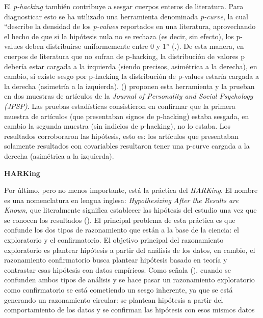 \documentclass[
  spanish,
  a4paper,
  oneside]{scrbook}
\begin{document}
El \emph{p-hacking} también contribuye a sesgar cuerpos enteros de
literatura. Para diagnosticar esto se ha utilizado una herramienta
denominada \emph{p-curve}, la cual ``describe la densidad de los
\emph{p-values} reportados en una literatura, aprovechando el hecho de
que si la hipótesis nula no se rechaza (es decir, sin efecto), los
p-values deben distribuirse uniformemente entre 0 y 1''
(.). De esta manera, en cuerpos de literatura que no
sufran de p-hacking, la distribución de valores p debería estar cargada
a la izquierda (siendo precisos, asimétrica a la derecha), en cambio, si
existe sesgo por p-hacking la distribución de p-values estaría cargada a
la derecha (asimetría a la izquierda).
() proponen esta herramienta y la prueban en dos muestras de
artículos de la \emph{Journal of Personality and Social Psychology
(JPSP)}. Las pruebas estadísticas consistieron en confirmar que la
primera muestra de artículos (que presentaban signos de p-hacking)
estaba sesgada, en cambio la segunda muestra (sin indicios de
p-hacking), no lo estaba. Los resultados corroboraron las hipótesis,
esto es: los artículos que presentaban solamente resultados con
covariables resultaron tener una p-curve cargada a la derecha
(asimétrica a la izquierda).

\textbf{HARKing}

Por último, pero no menos importante, está la práctica del
\emph{HARKing}. El nombre es una nomenclatura en lengua inglesa:
\emph{Hypothesizing After the Results are Known}, que literalmente
significa establecer las hipótesis del estudio una vez que se conocen
los resultados (). El
principal problema de esta práctica es que confunde los dos tipos de
razonamiento que están a la base de la ciencia: el exploratorio y el
confirmatorio. El objetivo principal del razonamiento exploratorio es
plantear hipótesis a partir del análisis de los datos, en cambio, el
razonamiento confirmatorio busca plantear hipótesis basado en teoría y
contrastar esas hipótesis con datos empíricos. Como señala
(),
cuando se confunden ambos tipos de análisis y se hace pasar un
razonamiento exploratorio como confirmatorio se está cometiendo un sesgo
inherente, ya que se está generando un razonamiento circular: se
plantean hipótesis a partir del comportamiento de los datos y se
confirman las hipótesis con esos mismos datos
\end{document}
